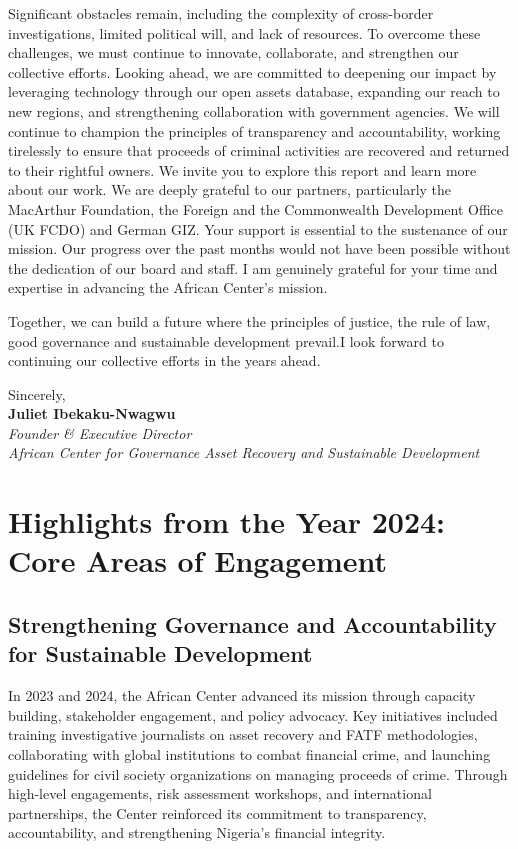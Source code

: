 \documentclass[
  letterpaper,
  DIV=11,
  numbers=noendperiod]{scrreprt}
\begin{document}
Significant obstacles remain, including the complexity of cross-border
investigations, limited political will, and lack of resources. To
overcome these challenges, we must continue to innovate, collaborate,
and strengthen our collective efforts. Looking ahead, we are committed
to deepening our impact by leveraging technology through our open assets
database, expanding our reach to new regions, and strengthening
collaboration with government agencies. We will continue to champion the
principles of transparency and accountability, working tirelessly to
ensure that proceeds of criminal activities are recovered and returned
to their rightful owners. We invite you to explore this report and learn
more about our work. We are deeply grateful to our partners,
particularly the MacArthur Foundation, the Foreign and the Commonwealth
Development Office (UK FCDO) and German GIZ. Your support is essential
to the sustenance of our mission. Our progress over the past months
would not have been possible without the dedication of our board and
staff. I am genuinely grateful for your time and expertise in advancing
the African Center's mission.

Together, we can build a future where the principles of justice, the
rule of law, good governance and sustainable development prevail.I look
forward to continuing our collective efforts in the years ahead.

Sincerely,\\
\textbf{Juliet Ibekaku-Nwagwu}\\
\emph{Founder \& Executive Director}\\
\emph{African Center for Governance Asset Recovery and Sustainable
Development}

\part{Highlights from the Year 2024: Core Areas of Engagement}

\chapter{Strengthening Governance and Accountability for Sustainable
Development}\label{strengthening-governance-and-accountability-for-sustainable-development-1}

In 2023 and 2024, the African Center advanced its mission through
capacity building, stakeholder engagement, and policy advocacy. Key
initiatives included training investigative journalists on asset
recovery and FATF methodologies, collaborating with global institutions
to combat financial crime, and launching guidelines for civil society
organizations on managing proceeds of crime. Through high-level
engagements, risk assessment workshops, and international partnerships,
the Center reinforced its commitment to transparency, accountability,
and strengthening Nigeria's financial integrity.
\end{document}
